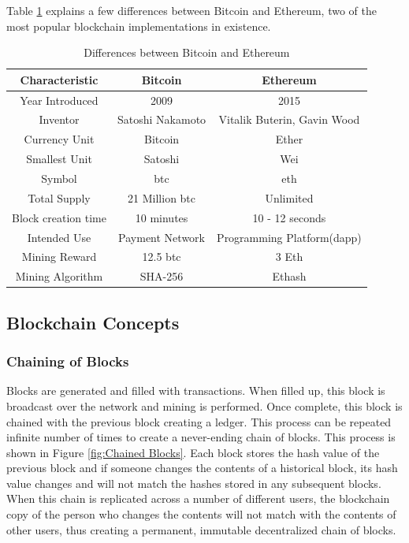 \documentclass[11pt,openright]{report}
\begin{document}
Table \ref{differences_bitcoin_ethereum} explains a few differences between Bitcoin and Ethereum, two of the most popular blockchain implementations in existence.


\begin{table}[!htbp]
	\renewcommand{\arraystretch}{1.3}
	\caption{Differences between Bitcoin and Ethereum}
	\label{differences_bitcoin_ethereum}
	\centering
	\doublespacing
	\begin{tabular}{|c||c|c|}
		\hline
		\bfseries Characteristic & \bfseries Bitcoin & \bfseries Ethereum\\
		\hline\hline
	    Year Introduced & 2009 & 2015\\ \hline
	    Inventor & Satoshi Nakamoto & Vitalik Buterin, Gavin Wood\\ \hline
	    Currency Unit & Bitcoin & Ether\\ \hline
	    Smallest Unit & Satoshi & Wei\\ \hline
	    Symbol & btc & eth \\ \hline
	    Total Supply & 21 Million btc & Unlimited\\ \hline
	    Block creation time & 10 minutes & 10 - 12 seconds\\ \hline
	    Intended Use & Payment Network & Programming Platform(dapp)\\ \hline
	    Mining Reward & 12.5 btc & 3 Eth \\ \hline
        Mining Algorithm & SHA-256 & Ethash \\ \hline
	\end{tabular}
\end{table}



\subsection{Blockchain Concepts}
\subsubsection{Chaining of Blocks}
Blocks are generated and filled with transactions. When filled up, this block is broadcast over the network and mining is performed. Once complete, this block is chained with the previous block creating a ledger. This process can be repeated infinite number of times to create a never-ending chain of blocks. This process is shown in Figure \ref{fig:Chained Blocks}. Each block stores the hash value of the previous block and if someone changes the contents of a historical block, its hash value changes and will not match the hashes stored in any subsequent blocks. When this chain is replicated across a number of different users, the blockchain copy of the person who changes the contents will not match with the contents of other users, thus creating a permanent, immutable decentralized chain of blocks.
\end{document}
